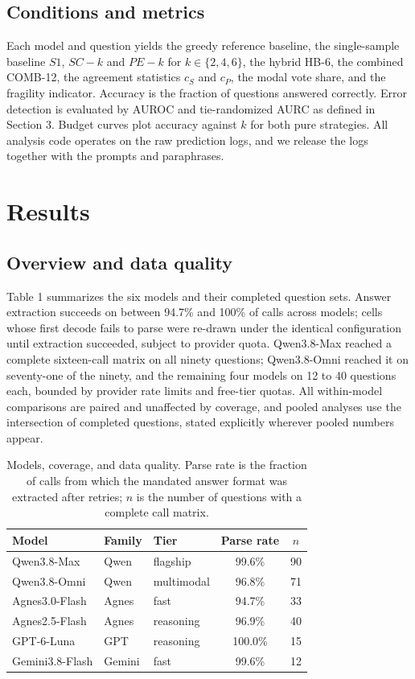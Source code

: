 \documentclass[preprint,12pt]{elsarticle}
\begin{document}
\subsection{Conditions and metrics}

Each model and question yields the greedy reference baseline, the single-sample baseline $S1$, $SC-k$ and $PE-k$ for $k \in \{2, 4, 6\}$, the hybrid HB-6, the combined COMB-12, the agreement statistics $c_{S}$ and $c_{P}$, the modal vote share, and the fragility indicator. Accuracy is the fraction of questions answered correctly. Error detection is evaluated by AUROC and tie-randomized AURC as defined in Section 3. Budget curves plot accuracy against $k$ for both pure strategies. All analysis code operates on the raw prediction logs, and we release the logs together with the prompts and paraphrases.

\section{Results}


\subsection{Overview and data quality}


Table 1 summarizes the six models and their completed question sets. Answer extraction succeeds on between 94.7\% and 100\% of calls across models; cells whose first decode fails to parse were re-drawn under the identical configuration until extraction succeeded, subject to provider quota. Qwen3.8-Max reached a complete sixteen-call matrix on all ninety questions; Qwen3.8-Omni reached it on seventy-one of the ninety, and the remaining four models on 12 to 40 questions each, bounded by provider rate limits and free-tier quotas. All within-model comparisons are paired and unaffected by coverage, and pooled analyses use the intersection of completed questions, stated explicitly wherever pooled numbers appear.

\begin{table}[htbp]
\centering
\small
\caption{Models, coverage, and data quality. Parse rate is the fraction of calls from which the mandated answer format was extracted after retries; $n$ is the number of questions with a complete call matrix.}

\begin{tabular}{l l l c c}
\toprule
Model & Family & Tier & Parse rate & $n$ \\
\midrule
Qwen3.8-Max & Qwen & flagship & 99.6\% & 90 \\
Qwen3.8-Omni & Qwen & multimodal & 96.8\% & 71 \\
Agnes3.0-Flash & Agnes & fast & 94.7\% & 33 \\
Agnes2.5-Flash & Agnes & reasoning & 96.9\% & 40 \\
GPT-6-Luna & GPT & reasoning & 100.0\% & 15 \\
Gemini3.8-Flash & Gemini & fast & 99.6\% & 12 \\
\bottomrule
\end{tabular}
\end{table}
\end{document}
